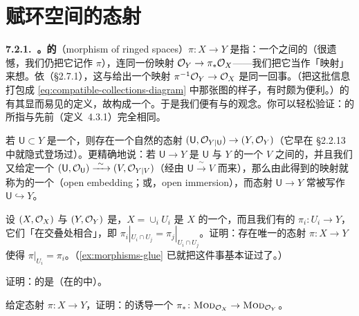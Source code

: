 
\section{赋环空间的态射}

\textbf{7.2.1.\ \trhDefinition{}。}\quad \textbf{\trRingedSpace{}的\trMorphism}（morphism of ringed spaces）$\pi\colon X\to Y$ 是指：一个\trTopologicalSpace{}之间的\trContinuousMap{}（很遗憾，我们仍把它记作 $\pi$），连同一份映射 $\mathcal{O}_Y\to\pi_*\mathcal{O}_X$——我们把它当作「\trPullback{}映射」来想。依\trAdjointness（\S2.7.1），这与给出一个映射 $\pi^{-1}\mathcal{O}_Y\to\mathcal{O}_X$ 是同一回事。（把这批信息打包成 \eqref{eq:compatible-collections-diagram} 中那张图的样子，有时颇为便利。）\trMorphism{}的\trComposition{}有其显而易见的定义，故\trRingedSpace{}构成一个\trCategory。于是我们便有\trAutomorphism{}与\trIsomorphism{}的观念。你可以轻松验证：\trRingedSpace{}的\trIsomorphism{}所指与先前（定义~4.3.1）完全相同。

若 $\mathsf{U}\subset Y$ 是一个\trOpenSubset，则存在一个自然的\trRingedSpace{}态射 $(\mathsf{U},\mathcal{O}_{Y|\mathsf{U}})\to(Y,\mathcal{O}_Y)$（它早在 \S2.2.13 中就隐式登场过）。更精确地说：若 $\mathsf{U}\to Y$ 是 $\mathsf{U}$ 与 $Y$ 的一个\trOpenSubset{} $V$ 之间的\trIsomorphism，并且我们又给定一个\trIsomorphism{} $(\mathsf{U},\OO_{\mathsf{U}})\mathrel{\xrightarrow{\ \sim\ }}(V,\OO_{Y|V})$（经由\trIsomorphism{} $\mathsf{U}\mathrel{\xrightarrow{\ \sim\ }}V$ 而来），那么由此得到的\trRingedSpace{}映射就称为\trRingedSpace{}的一个\textbf{\trOpenEmbedding}（open embedding；或\textbf{\trOpenImmersion}，open immersion），而态射 $\mathsf{U}\to Y$ 常被写作 $\mathsf{U}\hookrightarrow Y$。

\begin{exercise}\label{ex:ringed-space-morphisms-glue}
设 $(X,\mathcal{O}_X)$ 与 $(Y,\mathcal{O}_Y)$ 是\trRingedSpace，$X=\cup_i U_i$ 是 $X$ 的一个\trOpenCover，而且我们有\trRingedSpace{}的\trMorphisms{} $\pi_i\colon U_i\to Y$，它们「在交叠处相合」，即 $\pi_i|_{U_i\cap U_j}=\pi_j|_{U_i\cap U_j}$。证明：存在唯一的\trRingedSpace{}态射 $\pi\colon X\to Y$ 使得 $\pi|_{U_i}=\pi_i$。（\cref{ex:morphisms-glue} 已就\trTopologicalSpace{}把这件事基本证过了。）
\end{exercise}

\begin{exercise}\label{ex:open-embeddings-monomorphisms}
证明：\trRingedSpace{}的\trOpenEmbedding{}是\trMonomorphism{}（在\trRingedSpace{}的\trCategory{}中）。
\end{exercise}

\begin{exercise}\label{ex:pushforward-ox-modules}
给定\trRingedSpace{}态射 $\pi\colon X\to Y$，证明：\trSheaf{}的\trPushforward{}诱导一个\trFunctor{} $\pi_*\colon\textsc{Mod}_{\mathcal{O}_X}\to\textsc{Mod}_{\mathcal{O}_Y}$。
\end{exercise}

